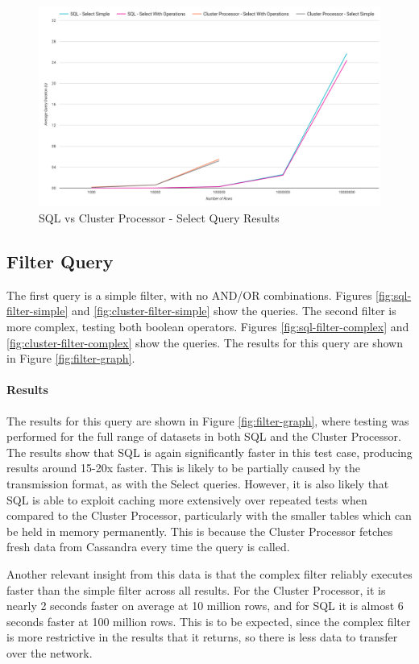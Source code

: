 \begin{figure}[h]
	\centering
	\includegraphics[width=0.8\linewidth]{chapters/diagrams/testing/select-simple-1k-1m}
	\caption{SQL vs Cluster Processor - Select Query Results}
	\label{fig:select-graph}
\end{figure}

\subsection{Filter Query}
The first query is a simple filter, with no AND/OR combinations. Figures \ref{fig:sql-filter-simple} and \ref{fig:cluster-filter-simple} show the queries.  The second filter is more complex, testing both boolean operators. Figures \ref{fig:sql-filter-complex} and \ref{fig:cluster-filter-complex} show the queries.
The results for this query are shown in Figure \ref{fig:filter-graph}. 

\paragraph{Results}
The results for this query are shown in Figure \ref{fig:filter-graph}, where testing was performed for the full range of datasets in both SQL and the Cluster Processor. The results show that SQL is again significantly faster in this test case, producing results around 15-20x faster. This is likely to be partially caused by the transmission format, as with the Select queries. However, it is also likely that SQL is able to exploit caching more extensively over repeated tests when compared to the Cluster Processor, particularly with the smaller tables which can be held in memory permanently. This is because the Cluster Processor fetches fresh data from Cassandra every time the query is called.

Another relevant insight from this data is that the complex filter reliably executes faster than the simple filter across all results. For the Cluster Processor, it is nearly 2 seconds faster on average at 10 million rows, and for SQL it is almost 6 seconds faster at 100 million rows. This is to be expected, since the complex filter is  more restrictive in the results that it returns, so there is less data to transfer over the network.

